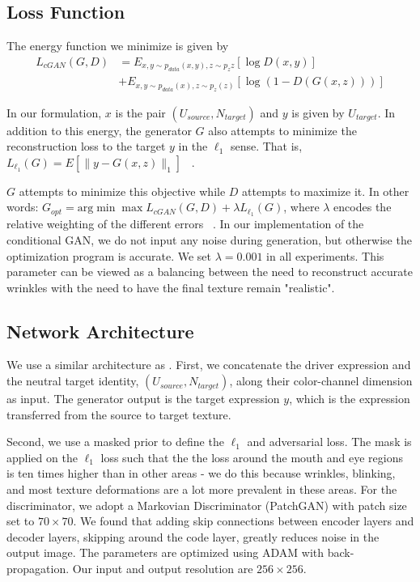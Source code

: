 \subsection{Loss Function}

The energy function we minimize is given by 
\begin{equation} \label{eqn:1}
\begin{split}
L_{cGAN}(G,D)& = E_{{x,y}\sim p_{data}({x,y}),z\sim p_z{z}}[\log D({x,y})]\\
& +E_{{x,y}\sim p_{data}(x),z\sim p_z(z)}[\log(1-D(G(x,z)))] 
\end{split}
\end{equation}

In our formulation, $x$ is the pair $(U_{source}, N_{target})$ and $y$ is given by $U_{target}$.  
In addition to this energy, the generator $G$ also attempts to minimize the reconstruction loss to the target $y$ in the $\ell_1$ sense.  
That is, $L_{\ell_1}(G)= E[\parallel y-G(x,z)\parallel_1]$ ~\cite{pix2pix}.

$G$ attempts to minimize this objective while $D$ attempts to maximize it.  In other words:
$ G_{opt}=\text{arg}\min\max L_{cGAN}(G,D)+\lambda L_{\ell_1}(G)$, where $\lambda$ 
encodes the relative weighting of the different errors ~\cite{pix2pix}.  In our implementation of the conditional GAN, 
we do not input any noise during generation, but otherwise the optimization program is accurate.  We set $\lambda = 0.001$ in all experiments. 
This parameter can be viewed as a balancing between the need to reconstruct accurate wrinkles with the need to have the final texture
remain "realistic".  

\subsection{Network Architecture}


We use a similar architecture as \cite{pix2pix}. 
First, we concatenate the driver expression and the neutral target identity, $(U_{source}, N_{target})$, along their color-channel dimension as input.
The generator output is the target expression $y$, which is the expression transferred from the source to target texture.

Second, we use a masked prior to define the $\ell_1$ and adversarial loss. 
The mask is applied on the $\ell_1$ loss such that the the loss around the mouth and eye regions is ten times higher than in other areas - we
do this because wrinkles, blinking, and most texture deformations are a lot more prevalent in these areas.  
For the discriminator, we adopt a Markovian Discriminator 
(PatchGAN) with patch size set to $70 \times 70$. We found that adding skip connections between
encoder layers and decoder layers, skipping around the code layer, greatly reduces noise in the output image. 
The parameters are
optimized using ADAM with back-propagation. Our input and output resolution are $256\times 256$.


